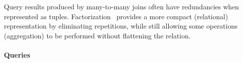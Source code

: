 
Query results produced by many-to-many joins often have redundancies when
represented as tuples. Factorization~\cite{DBLP:journals/sigmod/OlteanuS16}
provides a more compact (relational) representation by eliminating repetitions,
while still allowing some operations (\eg aggregation) to be performed without
flattening the relation.


\paragraph{Queries}
{\raggedright
}